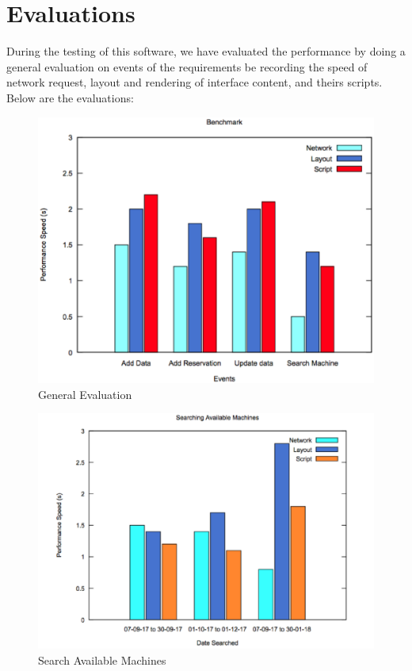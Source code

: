 \section{Evaluations}
During the testing of this software, we have evaluated the performance by doing a general evaluation on events of the requirements be recording the speed of network request, layout and rendering of interface content, and theirs scripts.  Below are the evaluations:
\begin{figure}[h]
 \includegraphics[width=\linewidth]{evaluation.eps}
  \caption{General Evaluation }
\end{figure}
\begin{figure}[h]
 \includegraphics[width=\linewidth]{evaluation2.eps}
  \caption{Search Available Machines}
\end{figure}

